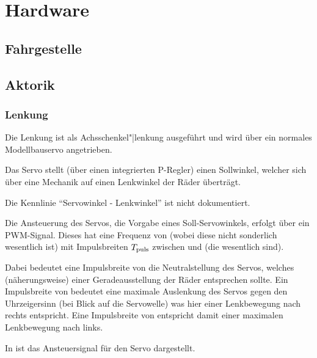 
\chapter{Hardware}


\section{Fahrgestelle}


\section{Aktorik}

\subsection{Lenkung}

Die Lenkung ist als Achsschenkel"|lenkung ausgeführt und wird über ein normales Modellbauservo angetrieben.

Das Servo stellt (über einen integrierten P-Regler) einen Sollwinkel, welcher sich über eine Mechanik auf einen Lenkwinkel der Räder überträgt.

Die Kennlinie "`Servowinkel - Lenkwinkel"' ist nicht dokumentiert.

Die Ansteuerung des Servos, \dah die Vorgabe eines Soll-Servowinkels, erfolgt über ein PWM-Signal. Dieses hat eine Frequenz von  (wobei diese nicht sonderlich wesentlich ist) mit Impulsbreiten $T_{\mathrm{puls}}$ zwischen  und  (die wesentlich sind).

Dabei bedeutet eine Impulsbreite von  die Neutralstellung des Servos, welches (näherungsweise) einer Geradeausstellung der Räder entsprechen sollte. Ein Impulsbreite von  bedeutet eine maximale Auslenkung des Servos gegen den Uhrzeigersinn (bei Blick auf die Servowelle) was hier einer Lenkbewegung nach rechts entspricht. Eine Impulsbreite von  entspricht damit einer maximalen Lenkbewegung nach links.

In  ist das Ansteuersignal für den Servo dargestellt.

